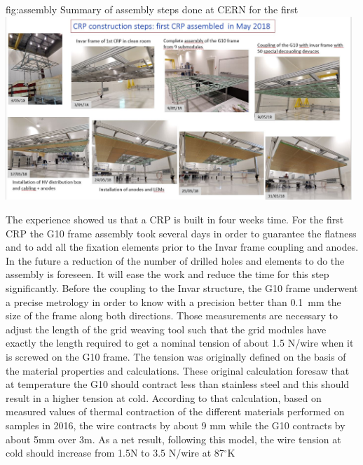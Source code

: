 \begin{dunefigure}
{fig:assembly}
{Summary of  assembly steps done at CERN for the first  }
\includegraphics[width=0.98\textwidth]{graphics/CRP-steps}
\end{dunefigure}

The  experience showed us that a CRP  is built in four weeks time. For the first CRP the G10 frame assembly 
took several days in order to guarantee the flatness and
 to add all the fixation elements prior to the Invar frame coupling and anodes. In the future a reduction of the 
number of drilled holes and elements to do the assembly is foreseen. It will ease the work and reduce the time for this step significantly.
Before the coupling to the Invar structure, the G10 frame underwent a precise metrology in order to know  with a precision better than \SI{0.1}{mm}  the size of the frame along both directions. Those measurements are necessary  to adjust the length of the grid weaving tool  such that the grid modules have exactly the length required to get a 
nominal tension of about \num{1.5} N/wire when it is screwed on the G10 frame.
The tension was originally defined on the basis of the material 
properties and calculations. These original 
calculation foresaw that at  temperature the G10 should contract less than stainless steel
 and this should result in a higher tension at cold. According to that calculation,
 based on measured values of thermal contraction of the different materials performed on samples in 2016, 
the wire contracts by about 9 mm while the G10 contracts by about 5mm over 3m. As a net result, following this model, 
the wire tension at cold should increase from 1.5N to 3.5 N/wire at 87$^\circ$K

